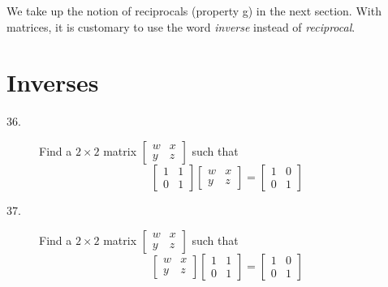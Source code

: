 \documentclass{article}
\begin{document}
We take up the notion of reciprocals (property g) in the next section. With matrices, it is customary to use the word \emph{inverse} instead of \emph{reciprocal}.




\newpage

\section{Inverses}

\begin{description}

  \item[36.] Find a $2 \times 2$ matrix $\begin{bmatrix} w & x \\ y & z \end{bmatrix}$ such that
    \begin{equation*}
    \begin{bmatrix} 1 & 1 \\ 0 & 1 \end{bmatrix} \begin{bmatrix} w & x \\ y & z \end{bmatrix} 
    = \begin{bmatrix} 1 & 0 \\ 0 & 1 \end{bmatrix}
    \end{equation*}

  \item[37.] Find a $2 \times 2$ matrix $\begin{bmatrix} w & x \\ y & z \end{bmatrix}$ such that
    \begin{equation*}
    \begin{bmatrix} w & x \\ y & z \end{bmatrix} \begin{bmatrix} 1 & 1 \\ 0 & 1 \end{bmatrix} 
    = \begin{bmatrix} 1 & 0 \\ 0 & 1 \end{bmatrix}
    \end{equation*}


\end{description}
\end{document}
